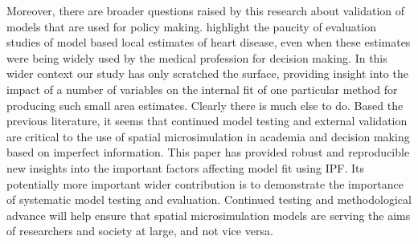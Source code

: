 \documentclass[a4paper,10pt]{article}
\begin{document}
Moreover, there are broader questions raised by this research about validation
of models that are used for policy making. \citet{Scarborough2009} highlight the
paucity of evaluation studies of model based local estimates of heart disease,
even when these estimates were being widely used by the medical profession for
decision making. In this wider context our study has only scratched the surface,
providing insight into the impact of a number of variables on the internal fit of
one particular method for producing such small area estimates. Clearly there is
much else to do. Based the previous literature, it seems that
continued model testing and external validation are critical to the use of spatial
microsimulation in academia and decision making based on imperfect information.
This paper has provided robust and reproducible new insights into the important factors affecting model
fit using IPF. Its potentially more important
wider contribution is to demonstrate the importance of
systematic model testing and evaluation. Continued testing and methodological advance
will help ensure that spatial microsimulation
models are serving the aims of researchers and society at large, and not vice versa.





% 
% 
% 
% 
%  
% 
% 
\end{document}
